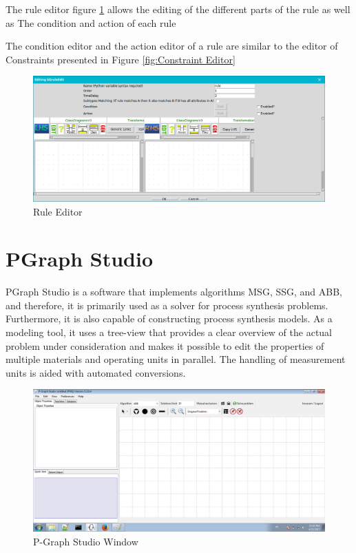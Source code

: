 The rule editor figure \ref{fig:Rule Editor} allows the editing of the different parts of the rule as well as
The condition and action of each rule 
 
The condition editor and the action editor of a rule are similar to the editor of
Constraints presented in Figure \ref{fig:Constraint Editor}

\begin{figure}[th]
	\centering
 	\includegraphics[scale=0.38]{ch3/img/ruleEditor}
	\caption{\label{fig:Rule Editor}Rule Editor}
\end{figure} 
 

\section{PGraph Studio}   
PGraph Studio is a software that implements algorithms MSG, SSG, and ABB, and therefore, it is primarily
used as a solver for process synthesis problems. Furthermore, it is also capable of constructing process synthesis models.
As a modeling tool, it uses a tree-view that provides a clear overview of the actual problem under consideration and makes
it possible to edit the properties of multiple materials and operating units in parallel. The handling of measurement units
is aided with automated conversions. \cite{ ch3-pgraph2, Sitepgraph}


\begin{figure}[th]
	\centering  %
 	\includegraphics[scale=0.44]{ch3/img/pgraph}
	\caption{\label{fig:pgraphstudio)}P-Graph Studio Window }
\end{figure}  

